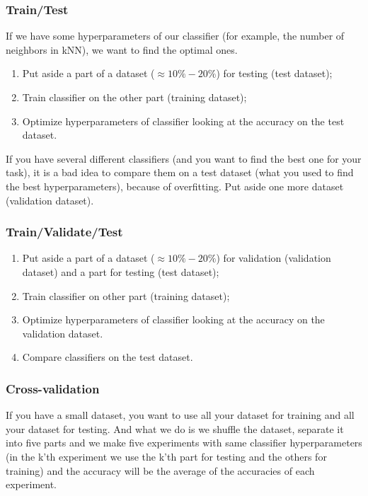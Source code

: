 \subsubsection*{Train/Test}

If we have some hyperparameters of our classifier (for example, the number of neighbors in kNN), we want to find the optimal ones.
\begin{enumerate}
	\item Put aside a part of a dataset ($\approx 10\%-20\%$) for testing (test dataset);
	\item Train classifier on the other part (training dataset);
	\item Optimize hyperparameters of classifier looking at the accuracy on the test dataset.
\end{enumerate}
If you have several different classifiers (and you want to find the best one for your task), it is a bad idea to compare them on a test dataset (what you used to find the best hyperparameters), because of overfitting. Put aside one more dataset (validation dataset).

\subsubsection*{Train/Validate/Test}

\begin{enumerate}
	\item Put aside a part of a dataset ($\approx 10\%-20\%$) for validation (validation dataset) and a part for testing (test dataset);
	\item Train classifier on other part (training dataset);
	\item Optimize hyperparameters of classifier looking at the accuracy on the validation dataset.
	\item Compare classifiers on the test dataset.
\end{enumerate}

\subsubsection*{Cross-validation}

If you have a small dataset, you want to use all your dataset for training and all your dataset for testing. And what we do is we shuffle the dataset, separate it into five parts and we make five experiments with same classifier hyperparameters (in the k'th experiment we use the k'th part for testing and the others for training) and the accuracy will be the average of the accuracies of each experiment.

